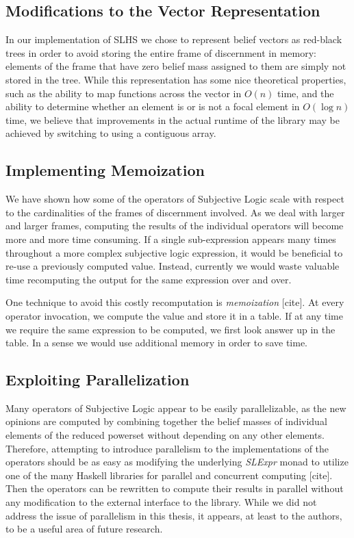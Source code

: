 \documentclass[thesis.tex]{subfiles}
\begin{document}
\subsection{Modifications to the Vector Representation}

In our implementation of SLHS we chose to represent belief vectors as red-black trees in
order to avoid storing the entire frame of discernment in memory: elements of the frame
that have zero belief mass assigned to them are simply not stored in the tree. While this
representation has some nice theoretical properties, such as the ability to map functions
across the vector in $O (n)$ time, and the ability to determine whether an element is or is
not a focal element in $O (\log n)$ time, we believe that improvements in the actual runtime
of the library may be achieved by switching to using a contiguous array.














\subsection{Implementing Memoization}

We have shown how some of the operators of Subjective Logic scale with respect
to the cardinalities of the frames of discernment involved. As we deal with
larger and larger frames, computing the results of the individual operators
will become more and more time consuming. If a single sub-expression appears
many times throughout a more complex subjective logic expression, it would be
beneficial to re-use a previously computed value. Instead, currently we would waste
valuable time recomputing the output for the same expression over and over.

One technique to avoid this costly recomputation is \emph{memoization} [cite].
At every operator invocation, we compute the value and store it in a table. If at
any time we require the same expression to be computed, we first look answer up in
the table. In a sense we would use additional memory in order to save time.



\subsection{Exploiting Parallelization}

Many operators of Subjective Logic appear to be easily parallelizable,
as the new opinions are computed by combining together the belief
masses of individual elements of the reduced powerset without
depending on any other elements. Therefore, attempting to introduce
parallelism to the implementations of the operators should be as easy
as modifying the underlying \emph{SLExpr} monad to utilize one of the
many Haskell libraries for parallel and concurrent computing
[cite]. Then the operators can be rewritten to compute their results
in parallel without any modification to the external interface to the
library. While we did not address the issue of parallelism in this
thesis, it appears, at least to the authors, to be a useful area of
future research.
\end{document}
